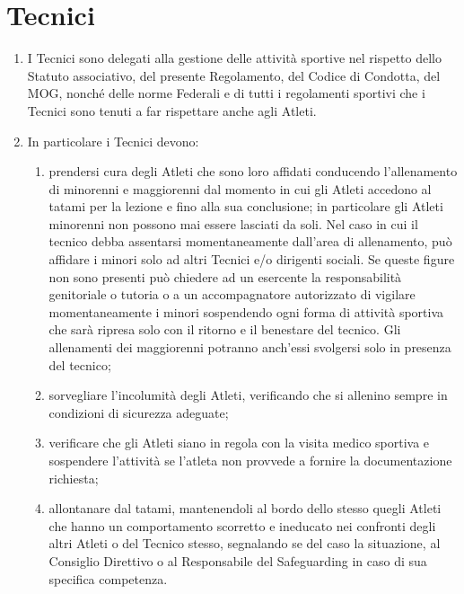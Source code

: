 \documentclass{djtsasddoc}
\begin{document}
	\section{Tecnici}
	\begin{enumerate}
		\item I Tecnici sono delegati alla gestione delle attività sportive nel rispetto dello Statuto associativo, del presente Regolamento, del Codice di Condotta, del MOG, nonché delle norme Federali e di tutti i regolamenti sportivi che i Tecnici sono tenuti a far rispettare anche agli Atleti.
		\item In particolare i Tecnici devono:
		\begin{enumerate}
			\item prendersi cura degli Atleti che sono loro affidati conducendo l'allenamento di minorenni e maggiorenni dal momento in cui gli Atleti accedono al tatami per la lezione e fino alla sua conclusione; in particolare gli Atleti minorenni non possono mai essere lasciati da soli. Nel caso in cui il tecnico debba assentarsi momentaneamente dall'area di allenamento, può affidare i minori solo ad altri Tecnici e/o dirigenti sociali. Se queste figure non sono presenti può chiedere ad un esercente la responsabilità genitoriale o tutoria o a un accompagnatore autorizzato di vigilare momentaneamente i minori sospendendo ogni forma di attività sportiva che sarà ripresa solo con il ritorno e il benestare del tecnico. Gli allenamenti dei maggiorenni potranno anch'essi svolgersi solo in presenza del tecnico;
			\item sorvegliare l'incolumità degli Atleti, verificando che si allenino sempre in condizioni di sicurezza adeguate;
			\item verificare che gli Atleti siano in regola con la visita medico sportiva e sospendere l'attività se l'atleta non provvede a fornire la documentazione richiesta;
			\item allontanare dal tatami, mantenendoli al bordo dello stesso quegli Atleti che hanno un comportamento scorretto e ineducato nei confronti degli altri Atleti o del Tecnico stesso, segnalando se del caso la situazione, al Consiglio Direttivo o al Responsabile del Safeguarding in caso di sua specifica competenza.
		\end{enumerate}
	\end{enumerate}
	
\end{document}

